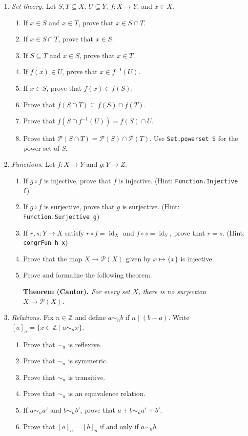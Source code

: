 \documentclass[a4paper]{article}
\begin{document}
\begin{enumerate}
\item {\sl Set theory.}
Let $S,T\subseteq X$, $U\subseteq Y$, $f:X\to Y$, and $x\in X$.
\begin{enumerate}
\item If $x\in S$ and $x\in T$, prove that $x\in S\cap T$.
\item If $x\in S\cap T$, prove that $x\in S$.
\item If $S\subseteq T$ and $x\in S$, prove that $x\in T$.
\item If $f(x)\in U$, prove that $x\in f^{-1}(U)$.
\item If $x\in S$, prove that $f(x)\in f(S)$.
\item Prove that $f(S\cap T)\subseteq f(S)\cap f(T)$.
\item Prove that $f(S\cap f^{-1}(U))=f(S)\cap U$.
    \item Prove that $\mathcal P(S\cap T)=\mathcal P(S)\cap\mathcal P(T)$. {\small Use \verb|Set.powerset S| for the power set of $S$.}
\end{enumerate}

\item {\sl Functions.}
Let $f:X\to Y$ and $g:Y\to Z$.
\begin{enumerate}
\item If $g\circ f$ is injective, prove that $f$ is injective. {\small (Hint: \verb|Function.Injective f|)}
\item If $g\circ f$ is surjective, prove that $g$ is surjective. {\small (Hint: \verb|Function.Surjective g|)}
\item If $r,s:Y\to X$ satisfy $r\circ f=\operatorname{id}_X$ and $f\circ s=\operatorname{id}_Y$, prove that $r=s$. {\small (Hint:  \verb|congrFun h x|)}
\item Prove that the map $X\to\mathcal P(X)$ given by $x\mapsto\{x\}$ is injective.
\item Prove and formalize the following theorem.\par
\textbf{Theorem (Cantor).} \textit{For every set $X$, there is no surjection $X\to\mathcal P(X)$.}
\end{enumerate}

\item {\sl Relations.}
Fix $n\in\mathbb Z$ and define $a\sim_n b$ if $n\mid(b-a)$.
Write $[a]_n=\{x\in\mathbb Z\mid a\sim_n x\}$.
\begin{enumerate}
\item Prove that $\sim_n$ is reflexive.
\item Prove that $\sim_n$ is symmetric.
\item Prove that $\sim_n$ is transitive.
\item Prove that $\sim_n$ is an equivalence relation.
\item If $a\sim_n a'$ and $b\sim_n b'$, prove that $a+b\sim_n a'+b'$.
\item Prove that $[a]_n=[b]_n$ if and only if $a\sim_n b$.
\end{enumerate}
\end{enumerate}
\end{document}
